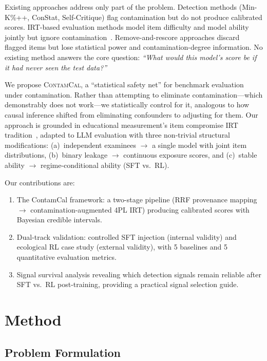 \documentclass[11pt,letterpaper]{article}
\begin{document}
Existing approaches address only part of the problem.
Detection methods (Min-K\%++, ConStat, Self-Critique) flag contamination but do not produce calibrated scores.
IRT-based evaluation methods model item difficulty and model ability jointly but ignore contamination~\citep{polo2024tinybenchmarks,raju2024growing,bai2024atlas}.
Remove-and-rescore approaches discard flagged items but lose statistical power and contamination-degree information.
No existing method answers the core question: \emph{``What would this model's score be if it had never seen the test data?''}

We propose \textsc{ContamCal}, a ``statistical safety net'' for benchmark evaluation under contamination.
Rather than attempting to eliminate contamination---which demonstrably does not work---we statistically control for it, analogous to how causal inference shifted from eliminating confounders to adjusting for them.
Our approach is grounded in educational measurement's item compromise IRT tradition~\citep{eckerly2017detecting,sinharay2017detection}, adapted to LLM evaluation with three non-trivial structural modifications:
(a)~independent examinees $\to$ a single model with joint item distributions,
(b)~binary leakage $\to$ continuous exposure scores, and
(c)~stable ability $\to$ regime-conditional ability (SFT vs.\ RL).

Our contributions are:
\begin{enumerate}
\item The ContamCal framework: a two-stage pipeline (RRF provenance mapping $\to$ contamination-augmented 4PL IRT) producing calibrated scores with Bayesian credible intervals.
\item Dual-track validation: controlled SFT injection (internal validity) and ecological RL case study (external validity), with 5 baselines and 5 quantitative evaluation metrics.
\item Signal survival analysis revealing which detection signals remain reliable after SFT vs.\ RL post-training, providing a practical signal selection guide.
\end{enumerate}

\section{Method}

\subsection{Problem Formulation}
\end{document}
